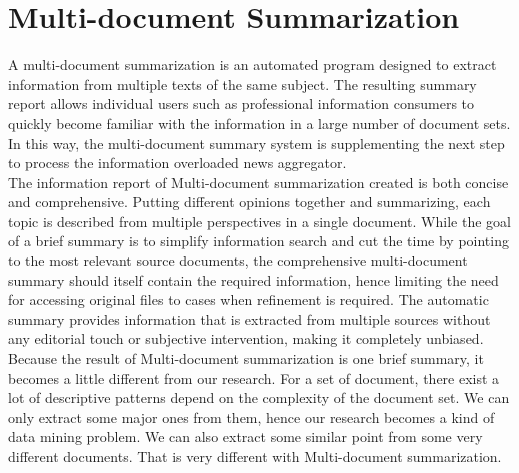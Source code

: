 \section{Multi-document Summarization}
A multi-document summarization is an automated program designed to extract information from multiple texts of the same subject. The resulting summary report allows individual users such as professional information consumers to quickly become familiar with the information in a large number of document sets. In this way, the multi-document summary system is supplementing the next step to process the information overloaded news aggregator.\\
The information report of Multi-document summarization created is both concise and comprehensive. Putting different opinions together and summarizing, each topic is described from multiple perspectives in a single document. While the goal of a brief summary is to simplify information search and cut the time by pointing to the most relevant source documents, the comprehensive multi-document summary should itself contain the required information, hence limiting the need for accessing original files to cases when refinement is required. The automatic summary provides information that is extracted from multiple sources without any editorial touch or subjective intervention, making it completely unbiased.\\
Because the result of Multi-document summarization is one brief summary, it becomes a little different from our research. For a set of document, there exist a lot of descriptive patterns depend on the complexity of the document set. We can only extract some major ones from them, hence our research becomes a kind of data mining problem. We can also extract some similar point from some very different documents. That is very different with Multi-document summarization.\\ 
